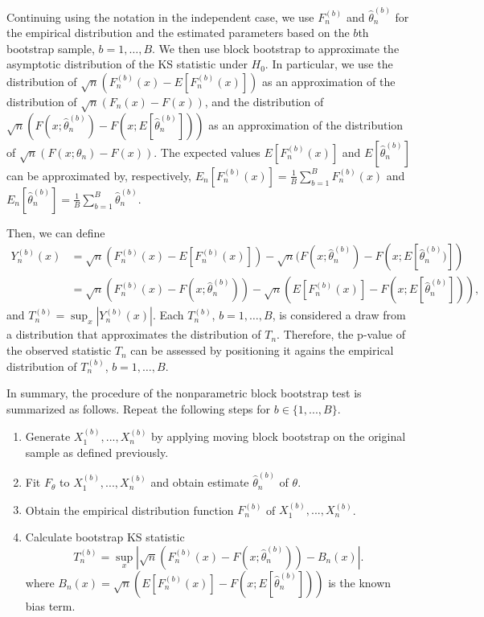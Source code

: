 \documentclass[APA,Times1COL]{WileyNJDv5} %
\begin{document}
Continuing using the notation in the independent case,
we use $F^{(b)}_n$ and $\hat\theta^{(b)}_n$ for the empirical distribution and
the estimated parameters based on the $b$th bootstrap sample,
$b = 1, \ldots, B$.
We then use block bootstrap to approximate the asymptotic distribution of
the KS statistic under $H_0$. In particular, we
use the distribution of $\sqrt{n}(F^{(b)}_n(x) - E[F^{(b)}_n(x)])$
as an approximation of the distribution of
$\sqrt{n}(F_n(x) - F(x))$, and the distribution of 
$\sqrt{n}(F(x; \hat\theta^{(b)}_n) - F(x; E[\hat\theta^{(b)}_n]))$ as
an approximation of the distribution of $\sqrt{n}(F(x; \theta_n) - F(x))$.
The expected values $E[F^{(b)}_n(x)]$ and
$E[\hat\theta^{(b)}_n]$ can be approximated by, respectively,
$E_n[F^{(b)}_n(x)] = \frac{1}{B}\sum_{b = 1}^BF^{(b)}_n(x)$ and
$E_n[\hat\theta^{(b)}_n]  =  \frac{1}{B}\sum_{b = 1}^B\hat\theta^{(b)}_n$.


Then, we can define
\begin{align*}
  Y^{(b)}_n(x) &= \sqrt{n}(F^{(b)}_n(x) - E[F^{(b)}_n(x)]) - 
             \sqrt{n}(F(x; \hat\theta^{(b)}_n) - F(x; E[\hat\theta^{(b)}_n)]) \\
           &= \sqrt{n}(F^{(b)}_n(x) - F(x; \hat\theta^{(b)}_n)) -
             \sqrt{n}(E[F^{(b)}_n(x)] - F(x; E[\hat\theta^{(b)}_n])),
\end{align*}
and $T^{(b)}_n = \sup_x|Y^{(b)}_n(x)|$. Each $T_n^{(b)}$,
$b =1, \ldots, B$, is considered a draw from a distribution that approximates
the distribution of $T_n$. Therefore, the p-value of the observed statistic
$T_n$ can be assessed by positioning it agains the empirical distribution of
$T_n^{(b)}$, $b = 1, \ldots, B$.


In summary, the procedure of the nonparametric block bootstrap test is 
summarized as follows. Repeat the following steps for $b \in \{1, ..., B\}$.
\begin{enumerate}
\item
  Generate $X^{(b)}_1,...,X^{(b)}_n$ by applying moving block bootstrap 
  on the original sample as
  defined previously.
\item
  Fit $F_\theta$ to $X^{(b)}_1,...,X^{(b)}_n$ and obtain estimate 
	$\hat\theta^{(b)}_n$ of $\theta$.
\item
  Obtain the empirical distribution function $F^{(b)}_n$ of
  $X^{(b)}_1,...,X^{(b)}_n$. 
\item
  Calculate bootstrap KS statistic
  \[
    T^{(b)}_n = \sup_x | \sqrt{n}\left(F^{(b)}_n(x) 
    - F(x; \hat\theta^{(b)}_n)\right) - B_n(x) |.
  \]
  where 
  $B_{n}(x) = \sqrt{n}(E[F^{(b)}_n(x)] - 
  F(x; E[\hat\theta^{(b)}_n]))$ is the known
  bias term.
\end{enumerate}
\end{document}

